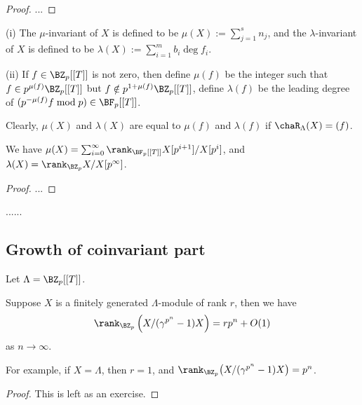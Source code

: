 \begin{proof}
...
\end{proof}

\begin{definition}
\label{iwasawa-mod-invariants}
{\rm(i)}
The $\mu$-invariant of $X$
is defined to be $\mu(X):=\sum_{j=1}^sn_j$,
and the $\lambda$-invariant of $X$
is defined to be $\lambda(X):=\sum_{i=1}^mb_i\deg f_i$.

{\rm(ii)}
If $f\in\BZ_p[[T]]$ is not zero, then define
$\mu(f)$ be the integer such that
$f\in p^{\mu(f)}\BZ_p[[T]]$ but
$f\notin p^{1+\mu(f)}\BZ_p[[T]]$,
define $\lambda(f)$ be the leading degree of
$(p^{-\mu(f)}f\bmod p)\in\BF_p[[T]]$.
\end{definition}

Clearly, $\mu(X)$ and $\lambda(X)$ are equal to
$\mu(f)$ and $\lambda(f)$ if $\chaR_\Lambda(X)=(f)$.

\begin{prop}
\label{iwasawa-mod-invariants-2}
We have $\mu(X)=\sum_{i=0}^\infty\rank_{\BF_p[[T]]}X[p^{i+1}]/X[p^i]$,
and $\lambda(X)=\rank_{\BZ_p}X/X[p^\infty]$.
\end{prop}

\begin{proof}
...
\end{proof}

......

\subsection{Growth of coinvariant part}

Let $\Lambda=\BZ_p[[T]]$.

\begin{lem}\label{p:rank-growth}
Suppose $X$ is a finitely generated $\Lambda$-module
of rank $r$,
then we have
$$
\rank_{\BZ_p}\left(X/(\gamma^{p^n}-1)X\right)=rp^n+O(1)
$$
as $n\to\infty$.
\end{lem}

For example, if $X=\Lambda$, then $r=1$,
and $\rank_{\BZ_p}\big(X/(\gamma^{p^n}-1)X\big)=p^n$.

\begin{proof}
This is left as an exercise.
\end{proof}

